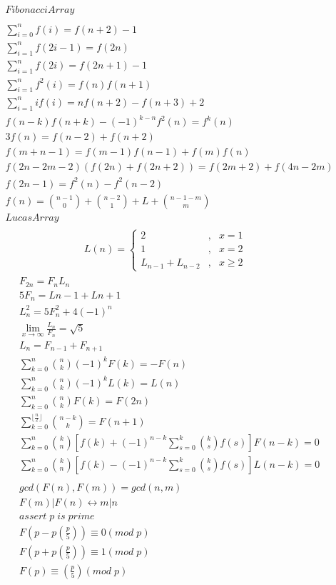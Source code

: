 \begin{align*}
& Fibonacci Array \\
& \\
& \sum_{i=0}^nf(i)=f(n+2)-1 \\
& \sum_{i=1}^nf(2i-1)=f(2n) \\
& \sum_{i=1}^nf(2i)=f(2n+1)-1 \\
& \sum_{i=1}^nf^2(i)=f(n)f(n+1) \\
& \sum_{i=1}^nif(i)=nf(n+2)-f(n+3)+2 \\
& f(n-k)f(n+k)-(-1)^{k-n}f^2(n)=f^k(n) \\
& 3f(n)=f(n-2)+f(n+2) \\
& f(m+n-1)=f(m-1)f(n-1)+f(m)f(n) \\
& f(2n-2m-2)(f(2n)+f(2n+2))=f(2m+2)+f(4n-2m) \\
& f(2n-1)=f^2(n)-f^2(n-2) \\
& f(n)=\binom{n-1}{0}+\binom{n-2}{1}+L+\binom{n-1-m}{m} \\
& Lucas Array \\
\end{align*}
$$ L(n)=\left\{
\begin{aligned}
2 & , & x = 1 \\
1 & , & x = 2 \\
L_{n-1}+L_{n-2} & , & x \geq 2
\end{aligned}
\right.
$$
\begin{align*}
& \\
& F_{2n}=F_nL_n \\
& 5F_n=L{n-1}+L{n+1} \\
& L^2_n=5F_n^2+4(-1)^n \\
& \lim\limits_{x \to \infty} \frac{L_n}{F_n} = \sqrt 5 \\
& L_n=F_{n-1}+F_{n+1} \\
& \sum\limits_{k=0}^{n}\binom n k (-1)^kF(k)=-F(n) \\
& \sum\limits_{k=0}^{n}\binom n k (-1)^kL(k)=L(n) \\
& \sum\limits_{k=0}^{n}\binom n k F(k)=F(2n) \\
& \sum\limits_{k=0}^{\lfloor\frac n 2\rfloor}\binom{n-k}{k}=F(n+1) \\
& \sum\limits_{k=0}^{n}\binom k n[f(k)+(-1)^{n-k}\sum\limits_{s=0}^k\binom k sf(s)]F(n-k)=0 \\
& \sum\limits_{k=0}^{n}\binom k n[f(k)-(-1)^{n-k}\sum\limits_{s=0}^k\binom k sf(s)]L(n-k)=0 \\
& \\
& gcd(F(n),F(m))=gcd(n,m) \\
& F(m)|F(n) \leftrightarrow m|n \\
& assert\;p\;is\;prime \\
& F(p-p\left(\frac p 5 \right))\equiv0(mod\;p) \\
& F(p+p\left(\frac p 5 \right))\equiv1(mod\;p) \\
& F(p)\equiv \left(\frac p 5\right)(mod\;p)
\end{align*}


